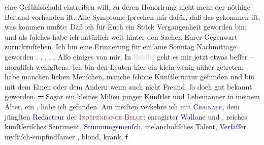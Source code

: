 \documentclass[twoside=false,titlepage=false,open=any, parskip=never, fontsize=12pt, headings=small, chapterprefix=false, appendixprefix=false]{scrbook}
\newcommand{\strikeout}[1]{\sout{#1}}
\newcommand{\dotsfive}{%
.\kern\ellipsisgap 
.\kern\ellipsisgap
.\kern\ellipsisgap
.\kern\ellipsisgap 
.\kern\ellipsisgap 
\relax}
\newcommand{\pbposition}{\depth}
\newcommand{\pb}{\nobreak\hspace{0pt}\raisebox{-0.1em}{\raisebox{\pbposition}{\textnormal{|}}}\nobreak\hspace{0pt}}
\begin{document}
               eine Gefühlsſchuld eintreiben will, zu deren Honorirung nicht mehr der nöthige
               Beſtand vorhanden iſt. Alle Symptome ſprechen mir dafür, daß das gekommen iſt, was
               kommen mußte: Daß ich für Euch ein Stück Vergangenheit geworden bin; und als ſolches
               habe ich natürlich weit hinter den Sachen Eurer Gegenwart zurückzuſtehen. Ich bin
               eine Erinnerung für einſame Sonntag Nachmittage geworden{\dotsfive}\pend
           \pstart
           Alſo einiges von mir. In \textcolor{pink}{Brüſſel}{}\ledrightnote{\textcolor{pink}{Brüssel}} geht es mir
               jetzt etwas beſſer – moraliſch wenigſtens. Ich bin den Leuten hier ein klein wenig
               näher getreten, habe {\pb}manchen lieben Menſchen,
               manche ſchöne Künſtlernatur gefunden und bin mit dem Einen oder dem Andern wenn auch
               nicht Freund, ſo doch gut bekannt geworden. \strikeout{\textcolor{gray}{×}} Sogar ein kleines Milieu junger Künſtler und Lebemänner in meinem Alter, ein
                  \label{K_L02669-1v}\label{K_L02669-1h}, habe ich gefunden. Am
               meiſten verkehre ich mit \textsc{\textcolor{blue}{Chainaye}{}\ledrightnote{\textcolor{blue}{Hector Chainaye}}}, dem jüngſten \textcolor{blue}{Redacteur}{} der \textcolor{brown}{\textsc{Indépendance Belge}}{}\ledrightnote{\textcolor{brown}{L’Indépendance Belge}}: enragirter \textcolor{blue}{Wallone}{}
               und \label{K_L02669-44v}\label{K_L02669-44h}, reiches
               künſtleriſches Sentiment, \textcolor{blue}{Stimmungsmenſch}{}, melancholiſches Talent, \textcolor{blue}{Verfaſſer}{} myſtiſch-empfindſamer \label{K_L02669-3v}\label{K_L02669-3h}, blond, krank, \strikeout{ſ}
\end{document}

